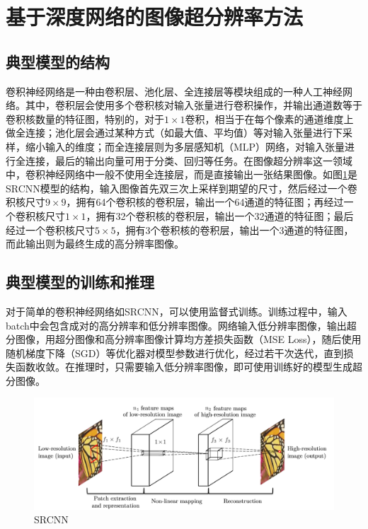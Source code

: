 \section{基于深度网络的图像超分辨率方法}

\subsection{典型模型的结构}
卷积神经网络是一种由卷积层、池化层、全连接层等模块组成的一种人工神经网络。其中，卷积层会使用多个卷积核对输入张量进行卷积操作，并输出通道数等于卷积核数量的特征图，特别的，对于$1\times 1$卷积，相当于在每个像素的通道维度上做全连接；池化层会通过某种方式（如最大值、平均值）等对输入张量进行下采样，缩小输入的维度；而全连接层则为多层感知机（MLP）网络，对输入张量进行全连接，最后的输出向量可用于分类、回归等任务。在图像超分辨率这一领域中，卷积神经网络中一般不使用全连接层，而是直接输出一张结果图像。如图\ref{fig:SRCNN}是SRCNN模型的结构，输入图像首先双三次上采样到期望的尺寸，然后经过一个卷积核尺寸$9\times 9$，拥有64个卷积核的卷积层，输出一个64通道的特征图；再经过一个卷积核尺寸$1\times 1$，拥有32个卷积核的卷积层，输出一个32通道的特征图；最后经过一个卷积核尺寸$5\times 5$，拥有3个卷积核的卷积层，输出一个3通道的特征图，而此输出则为最终生成的高分辨率图像。
\subsection{典型模型的训练和推理}
对于简单的卷积神经网络如SRCNN，可以使用监督式训练。训练过程中，输入batch中会包含成对的高分辨率和低分辨率图像。网络输入低分辨率图像，输出超分图像，用超分图像和高分辨率图像计算均方差损失函数（MSE Loss），随后使用随机梯度下降（SGD）等优化器对模型参数进行优化，经过若干次迭代，直到损失函数收敛。在推理时，只需要输入低分辨率图像，即可使用训练好的模型生成超分图像。

\begin{figure}[htbp]
    \centering
    \includegraphics[width=1.0\textwidth]{imgs/SRCNN.png}
    \caption{SRCNN}
    \label{fig:SRCNN}
\end{figure}

